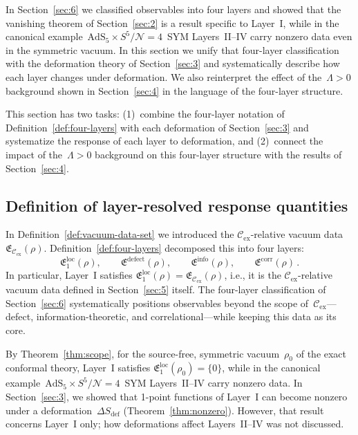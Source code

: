 \documentclass[
  aps,
  prd,
  preprint,
  groupedaddress,
  nofootinbib,
  longbibliography
]{revtex4-2}
\theoremstyle{remark}
\newcommand{\Cex}{\mathcal{C}_{\mathrm{ex}}}
\newcommand{\N}{\mathcal{N}}
\newcommand{\AdS}{\mathrm{AdS}}
\begin{document}
In Section~\ref{sec:6} we classified observables into four layers
and showed that the vanishing theorem of Section~\ref{sec:2} is
a result specific to Layer~I, while in the canonical
example~$\AdS_5\times S^5/\N=4$~SYM Layers~II--IV carry nonzero
data even in the symmetric vacuum.
In this section we unify that four-layer classification with the
deformation theory of Section~\ref{sec:3} and systematically
describe how each layer changes under deformation.
We also reinterpret the effect of the~$\Lambda>0$ background
shown in Section~\ref{sec:4} in the language of the four-layer
structure.

This section has two tasks:
(1)~combine the four-layer notation of
Definition~\ref{def:four-layers} with each deformation of
Section~\ref{sec:3} and systematize the response of each layer
to deformation, and
(2)~connect the impact of the~$\Lambda>0$ background on this
four-layer structure with the results of Section~\ref{sec:4}.

\subsection{Definition of layer-resolved response quantities}%
  \label{subsec:7-1}

In Definition~\ref{def:vacuum-data-set} we introduced the
$\Cex$-relative vacuum data
$\mathfrak{E}_{\Cex}(\rho)$.
Definition~\ref{def:four-layers} decomposed this into four
layers:
\[
  \mathfrak{E}_1^{\mathrm{loc}}(\rho),\qquad
  \mathfrak{E}^{\mathrm{defect}}(\rho),\qquad
  \mathfrak{E}^{\mathrm{info}}(\rho),\qquad
  \mathfrak{E}^{\mathrm{corr}}(\rho)\,.
\]
In particular, Layer~I satisfies
$\mathfrak{E}_1^{\mathrm{loc}}(\rho)
=\mathfrak{E}_{\Cex}(\rho)$, i.e., it is the $\Cex$-relative
vacuum data defined in Section~\ref{sec:5} itself.
The four-layer classification of Section~\ref{sec:6}
systematically positions observables beyond the scope
of~$\Cex$---defect, information-theoretic, and
correlational---while keeping this data as its core.

By Theorem~\ref{thm:scope}, for the source-free, symmetric
vacuum~$\rho_0$ of the exact conformal theory,
Layer~I satisfies
$\mathfrak{E}_1^{\mathrm{loc}}(\rho_0)=\{0\}$,
while in the canonical
example~$\AdS_5\times S^5/\N=4$~SYM Layers~II--IV carry
nonzero data.
In Section~\ref{sec:3}, we showed that 1-point functions of
Layer~I can become nonzero under a
deformation~$\Delta S_{\mathrm{def}}$
(Theorem~\ref{thm:nonzero}).
However, that result concerns Layer~I only; how deformations
affect Layers~II--IV was not discussed.
\end{document}
